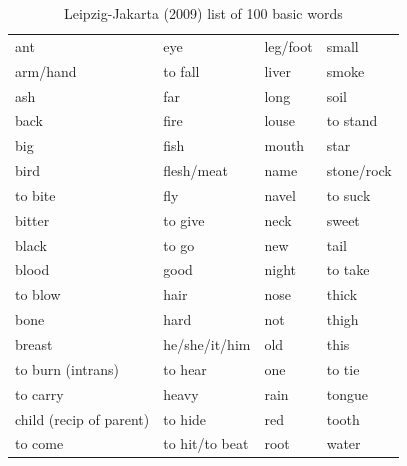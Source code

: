 \documentclass[output=paper]{LSP/langsci}
\begin{document}
\begin{table}
\caption{Leipzig-Jakarta (2009) list of 100 basic words} \label{LJ100}
\begin{tabular}{llll}    
\lsptoprule                                                                     
 ant                     &    eye                     &       leg/foot         &    small  \\
 arm/hand                &    to fall                 &       liver           &      smoke     \\
 ash                     &    far                     &       long            &     soil      \\
 back                    &    fire                    &       louse           &     to stand  \\
 big                     &    fish                    &       mouth           &     star         \\
 bird                    &    flesh/meat              &       name            &     stone/rock\\
 to bite                 &    fly                     &       navel           &     to suck\\
 bitter                  &    to give                 &       neck            &     sweet \\
 black                   &    to go                   &       new             &     tail \\
 blood                   &    good                    &       night           &     to take\\
 to blow                 &    hair                    &       nose            &     thick \\
 bone                    &    hard                    &       not             &     thigh \\
 breast                  &    he/she/it/him           &       old             &     this \\
 to burn (intrans)       &    to hear                 &         one            &      to tie\\
 to carry                &    heavy                   &       rain            &     tongue \\
 child (recip of parent) &     to hide                &         red           &      tooth\\
 to come                 &      to hit/to beat        &         root          &      water\\

\end{tabular}
\end{table}
\end{document}
